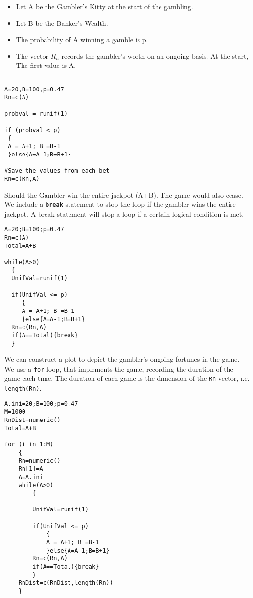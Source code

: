 \newpage
\begin{itemize}
\item Let A be the Gambler's Kitty at the start of the gambling.
\item Let B be the Banker's Wealth.
\item The probability of A winning a gamble is p.
\item The vector $R_n$ records the gambler's worth on an ongoing basis. At the start, The first value is A.
\end{itemize}

\begin{framed}
\begin{verbatim}

A=20;B=100;p=0.47
Rn=c(A)

probval = runif(1)

if (probval < p)
 {
 A = A+1; B =B-1
 }else{A=A-1;B=B+1}

#Save the values from each bet
Rn=c(Rn,A)
\end{verbatim}
\end{framed}
\newpage
Should the Gambler win the entire jackpot (A+B). The game would also cease. We include a \textbf{\texttt{break}} statement to stop the loop if the gambler wins the entire jackpot. A break statement will stop a loop if a certain logical condition is met.

\begin{framed}
\begin{verbatim}
A=20;B=100;p=0.47
Rn=c(A)
Total=A+B

while(A>0)
  {
  UnifVal=runif(1)

  if(UnifVal <= p)
     {
     A = A+1; B =B-1
     }else{A=A-1;B=B+1}
  Rn=c(Rn,A)
  if(A==Total){break}
  }
\end{verbatim}
\end{framed}
We can construct a plot to depict the gambler's ongoing fortunes in the game. We use a \texttt{for} loop, that implements the game, recording the duration of the game each time. The duration of each game is the dimension of the \texttt{Rn} vector, i.e. \texttt{length(Rn)}.


\begin{framed}
\begin{verbatim}
A.ini=20;B=100;p=0.47
M=1000
RnDist=numeric()
Total=A+B

for (i in 1:M)
    {
    Rn=numeric()
    Rn[1]=A
    A=A.ini
    while(A>0)
        {
       
        UnifVal=runif(1)

        if(UnifVal <= p)
            {
            A = A+1; B =B-1
            }else{A=A-1;B=B+1}
        Rn=c(Rn,A)
        if(A==Total){break}
        }
    RnDist=c(RnDist,length(Rn))
    }
    

\end{verbatim}
\end{framed}
